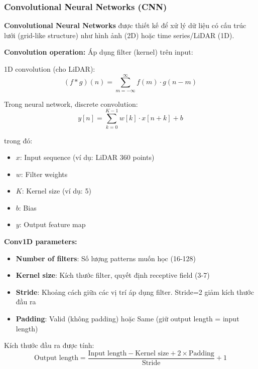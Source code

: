 \subsubsection{Convolutional Neural Networks (CNN)}

\textbf{Convolutional Neural Networks} \cite{lecun2015deep} được thiết kế để xử lý dữ liệu có cấu trúc lưới (grid-like structure) như hình ảnh (2D) hoặc time series/LiDAR (1D).

\textbf{Convolution operation:} Áp dụng filter (kernel) trên input:

1D convolution (cho LiDAR):
\begin{equation}
(f * g)(n) = \sum_{m=-\infty}^{\infty} f(m) \cdot g(n - m)
\end{equation}

Trong neural network, discrete convolution:
\begin{equation}
y[n] = \sum_{k=0}^{K-1} w[k] \cdot x[n + k] + b
\end{equation}

trong đó:
\begin{itemize}
\item $x$: Input sequence (ví dụ: LiDAR 360 points)
\item $w$: Filter weights
\item $K$: Kernel size (ví dụ: 5)
\item $b$: Bias
\item $y$: Output feature map
\end{itemize}

\textbf{Conv1D parameters:}

\begin{itemize}
\item \textbf{Number of filters}: Số lượng patterns muốn học (16-128)
\item \textbf{Kernel size}: Kích thước filter, quyết định receptive field (3-7)
\item \textbf{Stride}: Khoảng cách giữa các vị trí áp dụng filter. Stride=2 giảm kích thước đầu ra
\item \textbf{Padding}: Valid (không padding) hoặc Same (giữ output length = input length)
\end{itemize}

Kích thước đầu ra được tính:
\begin{equation}
\text{Output length} = \frac{\text{Input length} - \text{Kernel size} + 2 \times \text{Padding}}{\text{Stride}} + 1
\end{equation}

